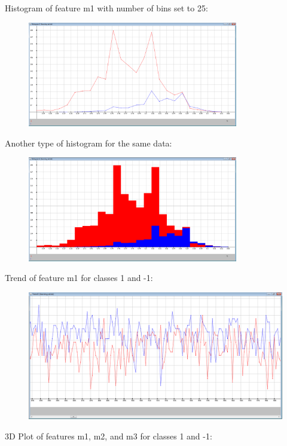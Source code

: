\documentclass[a4paper,12pt,english]{report}
\begin{document}
 
 
Histogram of feature m1 with number of bins set to 25:
 
 
 
\begin{figure}[htb]
\centering
\includegraphics[width=260pt]{s7.png}
\end{figure} 



Another type of histogram for the same data:



\begin{figure}[htb]
\centering
\includegraphics[width=260pt]{s8.png}
\end{figure} 

\newpage
Trend of feature m1 for classes 1 and -1:

\begin{figure}[htb]
\centering
\includegraphics[width=320pt]{s9.png}
\end{figure} 

3D Plot of features m1, m2, and m3 for classes 1 and -1:
\end{document}
